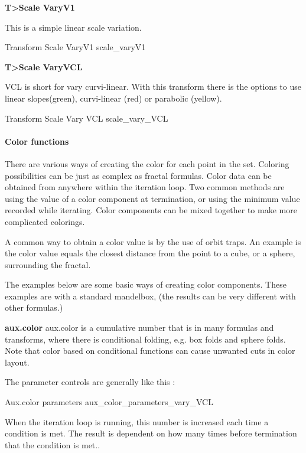 \textbf{T>Scale VaryV1}

This is a simple linear scale variation.

{Transform Scale VaryV1}
{scale_varyV1}

\textbf{T>Scale VaryVCL}

VCL is short for vary curvi-linear. With this transform there is the options to use linear slopes(green), curvi-linear (red) or parabolic (yellow).

{Transform Scale Vary VCL}
{scale_vary_VCL}




\paragraph{Color functions}

There are various ways of creating the color for each point in the set. Coloring possibilities  can be just as complex as fractal formulas. Color data can be obtained from anywhere within the iteration loop. Two common methods are using the value of a color component at termination, or using the minimum value recorded while iterating. Color components can be mixed together to make more complicated colorings.

A common way to obtain a color value is by the use of orbit traps. An example is the color value equals the closest distance from the point to a cube, or a sphere, surrounding the fractal.

The examples below are some basic ways of creating color components. These examples are with a standard  mandelbox, (the results can be very different with other formulas.)


\textbf{aux.color}
aux.color is a cumulative number that is in many formulas and transforms,  where there is conditional folding, e.g. box folds and sphere folds. Note that color based on conditional functions can cause unwanted cuts in color layout.

The parameter controls are generally like this :

{Aux.color parameters}
{aux_color_parameters_vary_VCL}

When the iteration loop is running, this number is increased each time a condition is met.  The result is dependent on how many times before termination  that the condition is met..

